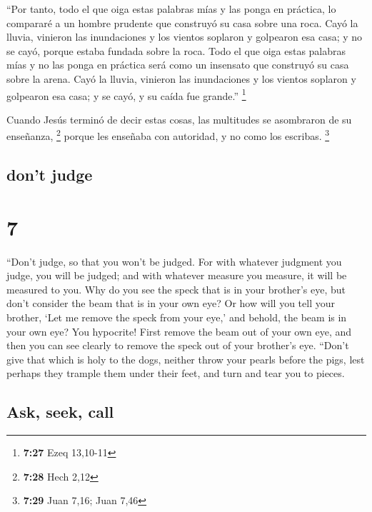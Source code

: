 \begin{paracol}{2}
 ``Por tanto, todo el que oiga estas palabras mías y las
ponga en práctica, lo compararé a un hombre prudente que construyó su
casa sobre una roca.  Cayó la lluvia, vinieron las
inundaciones y los vientos soplaron y golpearon esa casa; y no se cayó,
porque estaba fundada sobre la roca.  Todo el que oiga
estas palabras mías y no las ponga en práctica será como un insensato
que construyó su casa sobre la arena.  Cayó la lluvia,
vinieron las inundaciones y los vientos soplaron y golpearon esa casa; y
se cayó, y su caída fue grande.'' \footnote{\textbf{7:27} Ezeq 13,10-11}

 Cuando Jesús terminó de decir estas cosas, las
multitudes se asombraron de su enseñanza, \footnote{\textbf{7:28} Hech
  2,12}  porque les enseñaba con autoridad, y no como los
escribas. \footnote{\textbf{7:29} Juan 7,16; Juan 7,46}

\switchcolumn
\begin{otherlanguage}{english}

\hypertarget{dont-judge}{%
\subsection{don't judge}\label{dont-judge}}

\hypertarget{section-13}{%
\section{7}\label{section-13}}

 ``Don't judge, so that you won't be judged.
 For with whatever judgment you judge, you will be judged;
and with whatever measure you measure, it will be measured to you.
 Why do you see the speck that is in your brother's eye,
but don't consider the beam that is in your own eye?  Or
how will you tell your brother, `Let me remove the speck from your eye,'
and behold, the beam is in your own eye?  You hypocrite!
First remove the beam out of your own eye, and then you can see clearly
to remove the speck out of your brother's eye.  ``Don't
give that which is holy to the dogs, neither throw your pearls before
the pigs, lest perhaps they trample them under their feet, and turn and
tear you to pieces.

\hypertarget{ask-seek-call}{%
\subsection{Ask, seek, call}\label{ask-seek-call}}


\end{otherlanguage}
\end{paracol}
